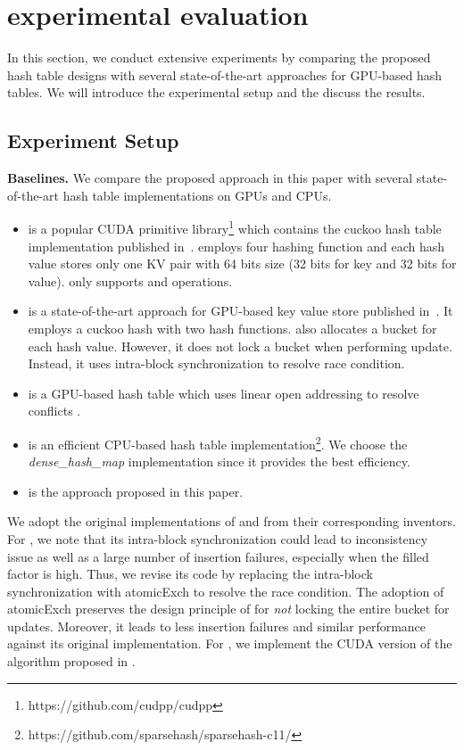 \section{experimental evaluation}\label{sec:exp}
In this section, we conduct extensive experiments by comparing the proposed hash table designs with several state-of-the-art approaches for GPU-based hash tables. 
We will introduce the experimental setup and the discuss the results. 

\subsection{Experiment Setup}\label{sec:exp:setup}

\vspace{1mm}\noindent\textbf{Baselines.} We compare the proposed approach in this paper with several state-of-the-art hash table implementations on GPUs and CPUs. 
\begin{itemize}
	\item \cudpp is a popular CUDA primitive library\footnote{https://github.com/cudpp/cudpp} which contains the cuckoo hash table implementation published in~\cite{alcantara2009real}. 
	\cudpp employs four hashing function and each hash value stores only one KV pair with 64 bits size (32 bits for key and 32 bits for value). 
	\cudpp only supports  and  operations. 
	\item \megakv is a state-of-the-art approach for GPU-based key value store published in~\cite{zhang2015mega}. It employs a cuckoo hash with two hash functions.
	\megakv also allocates a bucket for each hash value. However, it does not lock a bucket when performing update. Instead, it uses intra-block synchronization to resolve race condition. 
	\item \linear is a GPU-based hash table which uses linear open addressing to resolve conflicts \cite{hong2010mapcg}. 
	\item \google is an efficient CPU-based hash table implementation\footnote{https://github.com/sparsehash/sparsehash-c11/}. We choose the \emph{dense\_hash\_map} implementation since it provides the best efficiency.
	\item \voter is the approach proposed in this paper.
\end{itemize}
We adopt the original implementations of \cudpp and from their corresponding inventors. 
For \megakv, we note that its intra-block synchronization could lead to inconsistency issue as well as a large number of insertion failures, especially when the filled factor is high.  
Thus, we revise its code by replacing the intra-block synchronization with atomicExch to resolve the race condition. The adoption of atomicExch preserves the design principle of \megakv for \emph{not} locking the entire bucket for updates. Moreover, it leads to less insertion failures and similar performance against its original implementation. 
For \linear, we implement the CUDA version of the algorithm proposed in \cite{hong2010mapcg}.

